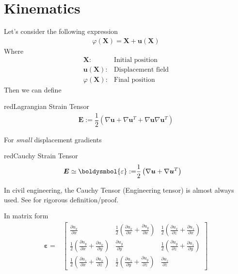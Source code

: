 \documentclass[a4paper, 11pt,article,oneside]{memoir}%
\begin{document}
\section{Kinematics}
Let's consider the following expression
\begin{align*}
\varphi(\boldsymbol{X})=\boldsymbol{X}+\boldsymbol{u(X)}
\end{align*}
Where 
\begin{align*}
\boldsymbol{X}:& \text{Initial position}\\
\boldsymbol{u (X)}:& \text{Displacement field}\\
\varphi(\boldsymbol{X}):& \text{Final position}
\end{align*}
Then we can define 
\begin{eqbox2}{red}{Lagrangian Strain Tensor}
\begin{align*}
\boldsymbol{E}:=\dfrac{1}{2}\left(\nabla\boldsymbol{u}+ \nabla\boldsymbol{u}^T+\nabla\boldsymbol{u}\nabla\boldsymbol{u}^T \right)
\end{align*}
\end{eqbox2}
For \textit{small} displacement gradients
\begin{eqbox2}{red}{Cauchy Strain Tensor}
\begin{align*}\label{tensor}
\boldsymbol{E} \simeq \boldysmbol{\varepsilon}:=&\dfrac{1}{2}\left(\nabla\boldsymbol{u}+\nabla\boldsymbol{u}^T \right)
\end{align*}
\end{eqbox2}
\begin{note}
In civil engineering, the Cauchy Tensor (Engineering tensor) is almost always used. See \cite{ICE2114} for rigorous definition/proof.
\end{note}
In matrix form
\begin{align*}
\boldsymbol{\varepsilon}=&\begin{bmatrix}
\frac{\partial u_x}{\partial x}&\frac{1}{2}\left(\frac{\partial u_x}{\partial x}+\frac{\partial u_y}{\partial x}\right)&\frac{1}{2}\left(\frac{\partial u_x}{\partial z}+\frac{\partial u_z}{\partial x}\right)\\
\frac{1}{2}\left(\frac{\partial u_y}{\partial x}+\frac{\partial u_x}{\partial y}\right)&\frac{\partial u_y}{\partial y}&\frac{1}{2}\left(\frac{\partial u_y}{\partial z}+\frac{\partial u_z}{\partial y}\right)\\
\frac{1}{2}\left(\frac{\partial u_z}{\partial x}+\frac{\partial u_x}{\partial z}\right)&\frac{1}{2}\left(\frac{\partial u_z}{\partial y}+\frac{\partial u_y}{\partial z}\right)&\frac{\partial u_z}{\partial z}
\end{bmatrix}
\end{align*}
\end{document}
